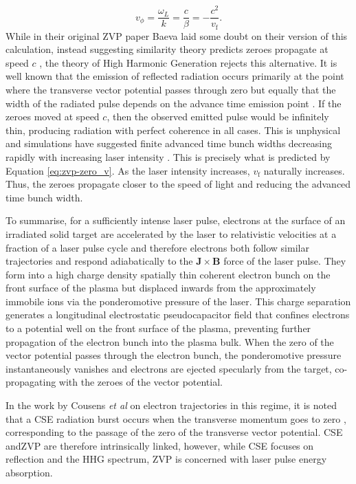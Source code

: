 \begin{equation}\label{eq:zvp-zero_v}
	v_\phi = \frac{\omega_L}{k} = \frac{c}{\beta} = -\frac{c^2}{v_\mathrm{f}}.
\end{equation}
While in their original ZVP paper Baeva laid some doubt on their version of this calculation, instead suggesting similarity theory predicts zeroes propagate at speed $c$ \cite{baevaZeroVectorPotential2011}, the theory of High Harmonic Generation rejects this alternative. It is well known that the emission of reflected radiation occurs primarily at the point where the transverse vector potential passes through zero \cite{cousensElectronTrajectoriesAssociated2020} but equally that the width of the radiated pulse depends on the advance time emission point \cite{edwardsXRayEmissionEffectiveness2020}. If the zeroes moved at speed $c$, then the observed emitted pulse would be infinitely thin, producing radiation with perfect coherence in all cases. This is unphysical and simulations have suggested finite advanced time bunch widths decreasing rapidly with increasing laser intensity \cite{edwardsXRayEmissionEffectiveness2020}. This is precisely what is predicted by Equation \ref{eq:zvp-zero_v}. As the laser intensity increases, $v_\mathrm{f}$ naturally increases. Thus, the zeroes propagate closer to the speed of light and reducing the advanced time bunch width.

To summarise, for a sufficiently intense laser pulse, electrons at the surface of an irradiated solid target are accelerated by the laser to relativistic velocities at a fraction of a laser pulse cycle and therefore electrons both follow similar trajectories and respond adiabatically to the $\mathbf{J}\times \mathbf{B}$ force of the laser pulse. They form into a high charge density spatially thin coherent electron bunch on the front surface of the plasma but displaced inwards from the approximately immobile ions via the ponderomotive pressure of the laser. This charge separation generates a longitudinal electrostatic pseudocapacitor field that confines electrons to a potential well on the front surface of the plasma, preventing further propagation of the electron bunch into the plasma bulk. When the zero of the vector potential passes through the electron bunch, the ponderomotive pressure instantaneously vanishes and electrons are ejected specularly from the target, co-propagating with the zeroes of the vector potential.

In the work by Cousens \textit{et al} on electron trajectories in this regime, it is noted that a \ac{CSE} radiation burst occurs when the transverse momentum goes to zero \cite{cousens2020}, corresponding to the passage of the zero of the transverse vector potential. \ac{CSE} and\ac{ZVP} are therefore intrinsically linked, however, while CSE focuses on reflection and the \ac{HHG} spectrum, \ac{ZVP} is concerned with laser pulse energy absorption. 

